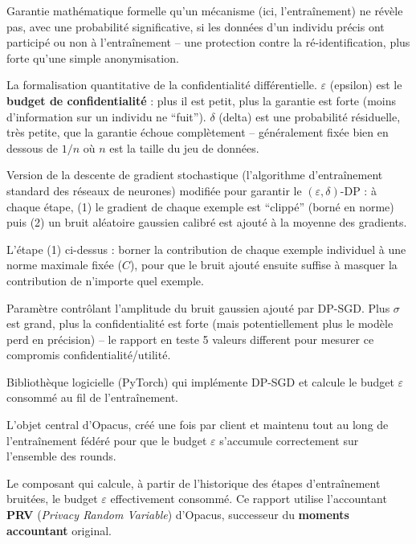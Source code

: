 \documentclass[11pt]{article}
\begin{document}
\begin{description}[leftmargin=0em, style=nextline]

\item[Confidentialité différentielle (\textit{Differential Privacy}, DP)] Garantie
mathématique formelle qu'un mécanisme (ici, l'entraînement) ne révèle pas, avec une
probabilité significative, si les données d'un individu précis ont participé ou non à
l'entraînement -- une protection contre la ré-identification, plus forte qu'une simple
anonymisation.

\item[$(\varepsilon, \delta)$-DP] La formalisation quantitative de la confidentialité
différentielle. $\varepsilon$ (epsilon) est le \textbf{budget de confidentialité} :
plus il est petit, plus la garantie est forte (moins d'information sur un individu ne
``fuit''). $\delta$ (delta) est une probabilité résiduelle, très petite, que la garantie
échoue complètement -- généralement fixée bien en dessous de $1/n$ où $n$ est la taille
du jeu de données.

\item[DP-SGD] Version de la descente de gradient stochastique (l'algorithme
d'entraînement standard des réseaux de neurones) modifiée pour garantir le
$(\varepsilon,\delta)$-DP : à chaque étape, (1) le gradient de chaque exemple est
``clippé'' (borné en norme) puis (2) un bruit aléatoire gaussien calibré est ajouté à la
moyenne des gradients.

\item[Clipping de gradient] L'étape (1) ci-dessus : borner la contribution de chaque
exemple individuel à une norme maximale fixée ($C$), pour que le bruit ajouté ensuite
suffise à masquer la contribution de n'importe quel exemple.

\item[Multiplicateur de bruit ($\sigma$)] Paramètre contrôlant l'amplitude du bruit
gaussien ajouté par DP-SGD. Plus $\sigma$ est grand, plus la confidentialité est forte
(mais potentiellement plus le modèle perd en précision) -- le rapport en teste 5 valeurs
different pour mesurer ce compromis confidentialité/utilité.

\item[Opacus] Bibliothèque logicielle (PyTorch) qui implémente DP-SGD et calcule le
budget $\varepsilon$ consommé au fil de l'entraînement.

\item[\textit{PrivacyEngine}] L'objet central d'Opacus, créé une fois par client et
maintenu tout au long de l'entraînement fédéré pour que le budget $\varepsilon$
s'accumule correctement sur l'ensemble des rounds.

\item[Accountant (comptable de confidentialité)] Le composant qui calcule, à partir de
l'historique des étapes d'entraînement bruitées, le budget $\varepsilon$ effectivement
consommé. Ce rapport utilise l'accountant \textbf{PRV} (\textit{Privacy Random
Variable}) d'Opacus, successeur du \textbf{moments accountant} original.

\end{description}
\end{document}

